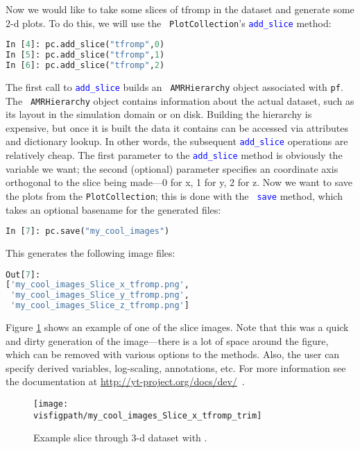 Now we would like to take some slices of tfromp in the dataset and
generate some 2-d plots.  To do this, we will use the {\tt
  PlotCollection}'s \textcolor{blue}{\tt add\_slice} method:
\begin{lstlisting}[language=Python]
In [4]: pc.add_slice("tfromp",0)
In [5]: pc.add_slice("tfromp",1)
In [6]: pc.add_slice("tfromp",2)
\end{lstlisting}
The first call to \textcolor{blue}{\tt add\_slice} builds an {\tt
  AMRHierarchy} object associated with {\tt pf}.  The {\tt
  AMRHierarchy} object contains information about the actual dataset,
such as its layout in the simulation domain or on disk.  Building the
hierarchy is expensive, but once it is built the data it contains can
be accessed via attributes and dictionary lookup.  In other words, the
subsequent \textcolor{blue}{\tt add\_slice} operations are relatively
cheap.  The first parameter to the \textcolor{blue}{\tt add\_slice}
method is obviously the variable we want; the second (optional)
parameter specifies an coordinate axis orthogonal to the slice being
made---0 for x, 1 for y, 2 for z.  Now we want to save the plots from
the {\tt PlotCollection}; this is done with the \textcolor{blue}{\tt
  save} method, which takes an optional basename for the generated files:
\begin{lstlisting}[language=Python]
In [7]: pc.save("my_cool_images")
\end{lstlisting}
This generates the following image files:
\begin{lstlisting}[language=Python]
Out[7]: 
['my_cool_images_Slice_x_tfromp.png',
 'my_cool_images_Slice_y_tfromp.png',
 'my_cool_images_Slice_z_tfromp.png']
\end{lstlisting}
Figure \ref{fig:yt_slice} shows an example of one of the slice images.
Note that this was a quick and dirty generation of the image---there
is a lot of space around the figure, which can be removed with various
options to the \yt methods.  Also, the user can specify derived
variables, log-scaling, annotations, etc. For more information see the
documentation at \url{http://yt-project.org/docs/dev/}\, .

\begin{figure}[!h]\label{fig:yt_slice}
\centering
\texttt{[image: \\visfigpath/my\_cool\_images\_Slice\_x\_tfromp\_trim]}
\caption{Example slice through 3-d dataset with \yt.}
\end{figure}

